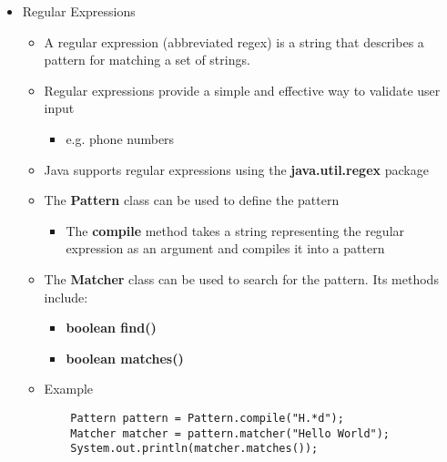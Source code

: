 \documentclass[11pt]{article}
\begin{document}
\begin{itemize}
	\newpage

	\item Regular Expressions
		\begin{itemize}
			\item A regular expression (abbreviated regex) is a string that describes a pattern for matching a set of strings.
			\item Regular expressions provide a simple and effective way to validate user input
				\begin{itemize}
					\item e.g. phone numbers
				\end{itemize}
			\item Java supports regular expressions using the \textbf{java.util.regex} package
			\item The \textbf{Pattern} class can be used to define the pattern
				\begin{itemize}
					\item The \textbf{compile} method takes a string representing the regular expression as an argument and compiles it into a pattern
				\end{itemize}
			\item The \textbf{Matcher} class can be used to search for the pattern. Its methods include:
				\begin{itemize}
					\item \textbf{boolean find()}
					\item \textbf{boolean matches()}
				\end{itemize}
			\item Example
			\begin{Verbatim}
	Pattern pattern = Pattern.compile("H.*d");
	Matcher matcher = pattern.matcher("Hello World");
	System.out.println(matcher.matches());
			\end{Verbatim}
		\end{itemize}


\end{itemize}
\end{document}
